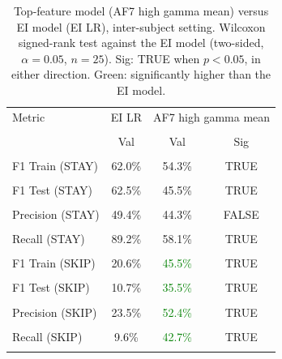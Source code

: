\begin{table}[H]
\centering
\begin{tabular}{lccc}
\hline
Metric & EI LR & \multicolumn{2}{c}{AF7 high gamma mean} \\\\
 & Val & Val & Sig \\\\
\hline
F1 Train (STAY) & 62.0\% & 54.3\% & TRUE \\\\
F1 Test (STAY) & 62.5\% & 45.5\% & TRUE \\\\
Precision (STAY) & 49.4\% & 44.3\% & FALSE \\\\
Recall (STAY) & 89.2\% & 58.1\% & TRUE \\\\
F1 Train (SKIP) & 20.6\% & \textcolor{green}{45.5\%} & TRUE \\\\
F1 Test (SKIP) & 10.7\% & \textcolor{green}{35.5\%} & TRUE \\\\
Precision (SKIP) & 23.5\% & \textcolor{green}{52.4\%} & TRUE \\\\
Recall (SKIP) & 9.6\% & \textcolor{green}{42.7\%} & TRUE \\\\
\hline
\end{tabular}
\caption{Top-feature model (AF7 high gamma mean) versus EI model (EI LR), inter-subject setting. Wilcoxon signed-rank test against the EI model (two-sided, $\alpha=0.05$, $n=25$). Sig: TRUE when $p<0.05$, in either direction. Green: significantly higher than the EI model.}
\label{tab:metrics_5_inter_1}
\end{table}